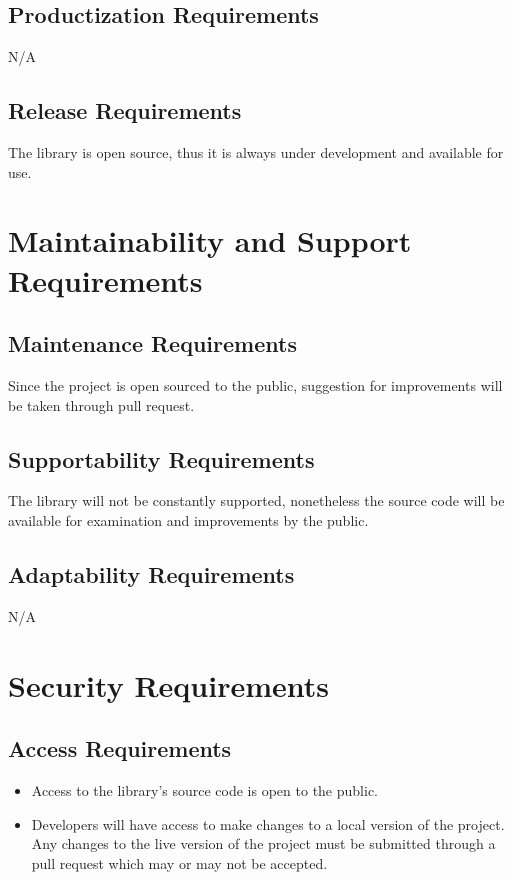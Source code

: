 \documentclass[12pt]{article}
\begin{document}
\subsection {Productization Requirements}
N/A

\subsection {Release Requirements}
The library is open source, thus it is always under development and available for use.

\section {Maintainability and Support Requirements}

\subsection {Maintenance Requirements}
Since the project is open sourced to the public, suggestion for improvements will be taken through pull request.

\subsection {Supportability Requirements}
The library will not be constantly supported, nonetheless the source code will be available for examination and improvements by the public.

\subsection {Adaptability Requirements}
N/A

\section {Security Requirements}

\subsection {Access Requirements}
\begin{itemize}
	\item Access to the library’s source code is open to the public.
	\item Developers will have access to make changes to a local version of the project. Any changes to the live version of the project must be submitted through a pull request which may or may not be accepted.
\end{itemize}
\end{document}
